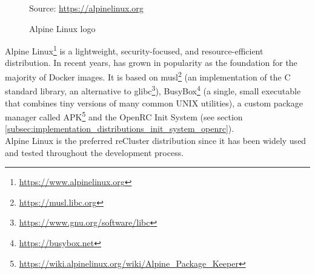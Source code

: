 \begin{figure} %
  \centering
  \def\stackalignment{r} %
  {\scriptsize \parbox[t]{\linewidth}{ Source: \url{https://alpinelinux.org}} }
  \caption{Alpine Linux logo}
\end{figure}

Alpine Linux\footnote{\url{https://www.alpinelinux.org}} is a lightweight, security-focused,
and resource-efficient distribution. In recent years, has grown in popularity as
the foundation for the majority of Docker images. It is based on musl\footnote{\url{https://musl.libc.org}}
(an implementation of the C standard library, an alternative to glibc\footnote{\url{https://www.gnu.org/software/libc}}),
BusyBox\footnote{\url{https://busybox.net}} (a single, small executable that combines
tiny versions of many common UNIX utilities), a custom package manager called APK\footnote{\url{https://wiki.alpinelinux.org/wiki/Alpine_Package_Keeper}}
and the OpenRC Init System (see section
\ref{subsec:implementation_distributions_init_system_openrc})\cite{alpine_linux}.
\\ %
Alpine Linux is the preferred reCluster distribution since it has been widely
used and tested throughout the development process.

